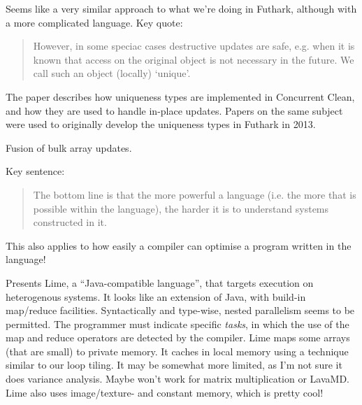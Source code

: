 \documentclass[a4paper, oneside, final]{memoir}
\begin{document}
\begin{quote}
\end{quote}

Seems like a very similar approach to what we're doing in Futhark,
although with a more complicated language.  Key quote:

\begin{quote}
  However, in some speciac cases destructive updates are safe,
  e.g. when it is known that access on the original object is not
  necessary in the future. We call such an object (locally) `unique'.
\end{quote}

The paper describes how uniqueness types are implemented in Concurrent
Clean, and how they are used to handle in-place updates.  Papers on
the same subject were used to originally develop the uniqueness types
in Futhark in 2013.

\begin{quote}
\end{quote}

Fusion of bulk array updates.

\begin{quote}
\end{quote}

Key sentence:

\begin{quote}
  The bottom line is that the more powerful a language (i.e. the more
  that is possible within the language), the harder it is to
  understand systems constructed in it.
\end{quote}

This also applies to how easily a compiler can optimise a program
written in the language!

\begin{quote}
\end{quote}

Presents Lime, a ``Java-compatible language'', that targets execution
on heterogenous systems.  It looks like an extension of Java, with
build-in map/reduce facilities.  Syntactically and type-wise, nested
parallelism seems to be permitted.  The programmer must indicate
specific \textit{tasks}, in which the use of the map and reduce
operators are detected by the compiler.  Lime maps some arrays (that
are small) to private memory.  It caches in local memory using a
technique similar to our loop tiling.  It may be somewhat more
limited, as I'm not sure it does variance analysis.  Maybe won't work
for matrix multiplication or LavaMD.  Lime also uses image/texture-
and constant memory, which is pretty cool!
\end{document}
